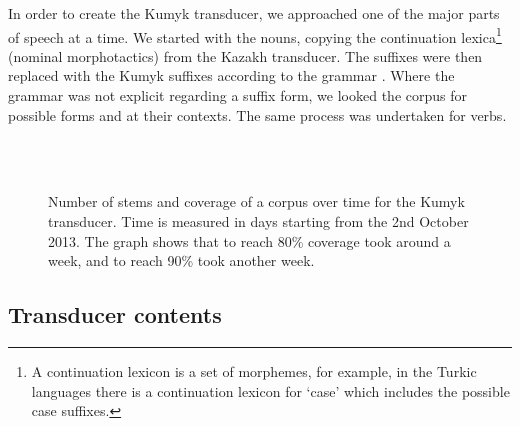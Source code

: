 \documentclass[a4paper,11pt,twocolumn]{article}
\begin{document}

In order to create the Kumyk transducer, we approached one of the major parts of speech at a time. We started with the nouns, copying the 
continuation lexica\footnote{A continuation lexicon is a set of morphemes, for example, in the Turkic languages there is a continuation lexicon for `case' which includes the possible case suffixes.} (nominal morphotactics) from the Kazakh transducer. The suffixes were then replaced with the Kumyk suffixes according to the grammar \citep{olmesov2000}. Where the grammar was not explicit regarding a suffix form, we looked the corpus for possible forms and at their contexts. The same process was undertaken for verbs. 


\begin{figure}
\hspace{-35pt}
~\\
~\\

\caption{Number of stems and coverage of a corpus over time for the Kumyk transducer. Time is measured in days 
starting from the 2nd October 2013. The graph shows that to reach 80\% coverage took
around a week, and to reach 90\% took another week.}
\label{fig:kumcov}
\end{figure}

\subsection{Transducer contents}
\end{document}
